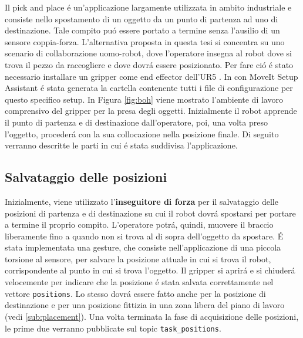 Il pick and place \'{e} un'applicazione largamente utilizzata in ambito industriale e consiste nello spostamento di un oggetto 
da un punto di partenza ad uno di destinazione. Tale compito pu\'{o} essere portato a termine senza l'ausilio di un sensore 
coppia-forza. L'alternativa proposta in questa tesi si concentra su uno scenario di collaborazione uomo-robot, dove l'operatore 
insegna al robot dove si trova il pezzo da raccogliere e dove dovr\'{a} essere posizionato. 
Per fare ci\'{o} \'{e} stato necessario installare un gripper come end effector 
dell'UR5 \cite{gripper_repo}. In \cite{environment_setup} con MoveIt Setup Assistant \'{e} stata generata la cartella contenente 
tutti i file di configurazione per questo specifico setup. 
In Figura \ref{fig:boh} viene mostrato l'ambiente di lavoro comprensivo del gripper per la presa degli oggetti. 
Inizialmente il robot apprende il punto di partenza e di destinazione dall'operatore, poi, una volta preso l'oggetto, 
proceder\'{a} con la sua collocazione nella posizione finale.
Di seguito verranno descritte le parti in cui \'{e} stata suddivisa l'applicazione.
\subsection{Salvataggio delle posizioni} \label{sub:positions}
Inizialmente, viene utilizzato l'\textbf{inseguitore di forza} per il salvataggio delle posizioni di partenza e di destinazione 
su cui il robot dovr\'{a} spostarsi per portare a termine il proprio compito. 
L'operatore potr\'{a}, quindi, muovere il braccio liberamente fino a quando non si trova al di sopra dell'oggetto da spostare. 
\'{E} stata implementata una gesture, che consiste nell'applicazione di una piccola torsione al sensore, 
per salvare la posizione attuale in cui si trova il robot, corrispondente al punto in cui si trova l'oggetto. Il gripper 
si aprir\'{a} e si chiuder\'{a} velocemente per 
indicare che la posizione \'{e} stata salvata correttamente nel vettore \verb|positions|.
Lo stesso dovr\'{a} essere fatto anche per la posizione di destinazione e per una posizione fittizia in una zona libera 
del piano di lavoro (vedi \ref{sub:placement}). Una volta terminata la fase di acquisizione delle posizioni, 
le prime due verranno pubblicate sul topic \verb|task_positions|.

